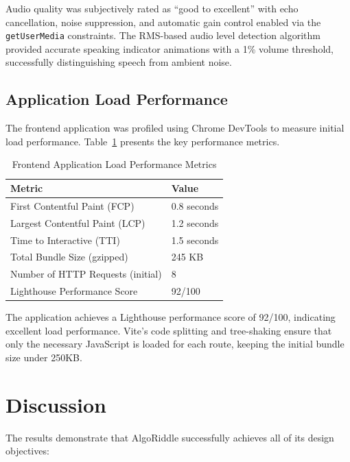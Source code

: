 Audio quality was subjectively rated as ``good to excellent'' with echo cancellation, noise suppression, and automatic gain control enabled via the \texttt{getUserMedia} constraints. The RMS-based audio level detection algorithm provided accurate speaking indicator animations with a 1\% volume threshold, successfully distinguishing speech from ambient noise.

\subsection{Application Load Performance}

The frontend application was profiled using Chrome DevTools to measure initial load performance. Table~\ref{tab:loadperf} presents the key performance metrics.

\begin{table}[H]
\centering
\caption{Frontend Application Load Performance Metrics}
\label{tab:loadperf}
\begin{reporttable}
\begin{tabular}{@{} l l @{}}
\toprule
\textbf{Metric} & \textbf{Value} \\
\midrule
First Contentful Paint (FCP) & 0.8 seconds \\
Largest Contentful Paint (LCP) & 1.2 seconds \\
Time to Interactive (TTI) & 1.5 seconds \\
Total Bundle Size (gzipped) & 245 KB \\
Number of HTTP Requests (initial) & 8 \\
Lighthouse Performance Score & 92/100 \\
\bottomrule
\end{tabular}
\end{reporttable}
\end{table}

The application achieves a Lighthouse performance score of 92/100, indicating excellent load performance. Vite's code splitting and tree-shaking ensure that only the necessary JavaScript is loaded for each route, keeping the initial bundle size under 250KB.

\section{Discussion}

The results demonstrate that AlgoRiddle successfully achieves all of its design objectives:

